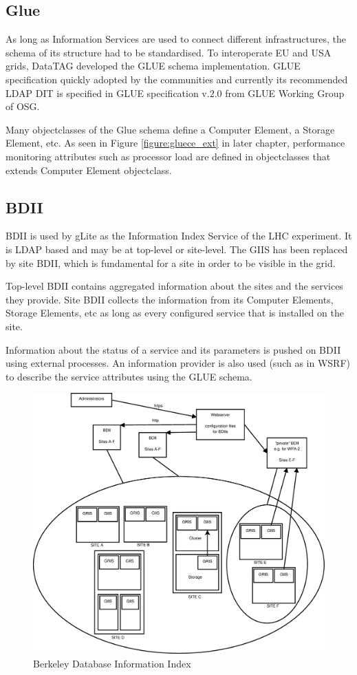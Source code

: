 \subsection{Glue}
As long as Information Services are used to connect different infrastructures,
the schema of its structure had to be standardised. To interoperate EU and USA
grids, DataTAG developed the GLUE schema implementation. GLUE specification
quickly adopted by the communities and currently its recommended LDAP DIT is
specified in GLUE specification v.$2.0$ from GLUE Working Group of OSG.

Many objectclasses of the Glue schema define a Computer Element, a Storage
Element, etc. As seen in Figure \ref{figure:gluece_ext} in later chapter,
performance monitoring attributes such as processor load are defined in
objectclasses that extends Computer Element objectclass.

\subsection{BDII}\label{subsec:bdii}
BDII is used by gLite as the Information Index Service of the LHC experiment. It
is LDAP based and may be at top-level or site-level. The GIIS has been replaced
by site BDII, which is fundamental for a site in order to be visible in the
grid.

Top-level BDII contains aggregated information about the sites and the services
they provide. Site BDII collects the information from its Computer Elements,
Storage Elements, etc as long as every configured service that is installed
on the site.

Information about the status of a service and its parameters is pushed on BDII
using external processes. An information provider is also used (such as in WSRF)
to describe the service attributes using the GLUE schema.

\begin{figure}[htb]
\centering
 \includegraphics[width=5in]{images/bdii.eps}
\caption{Berkeley Database Information Index}
\label{figure:bdii}
\end{figure}

